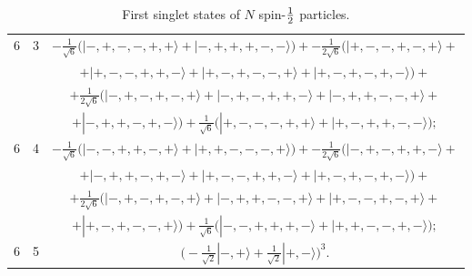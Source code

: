\documentclass[pra,amsfonts,showpacs,preprint,showkeys]{revtex4}
\begin{document}
\begin{table}
\begin{tabular}{ccc}
6&3&$ -\frac{1}{{\sqrt{6}}}\big(|-,+,-,-,+,+\rangle
+|-,+,+,+,-,-\rangle\big)+-\frac{1}{2
{\sqrt{6}}}\big(|+,-,-,+,-,+\rangle +$\\&&$+ |+,-,-,+,+,-\rangle+
 |+,-,+,-,-,+\rangle +|+,-,+,-,+,-\rangle\big)+$\\&&$ +\frac{1}{2 {\sqrt{6}}}\big(|-,+,-,+,-,+\rangle +
 |-,+,-,+,+,-\rangle +|-,+,+,-,-,+\rangle
 +$\\&&$+|-,+,+,-,+,-\rangle\big)+
 \frac{1}{{\sqrt{6}}}\big(|+,-,-,-,+,+\rangle +|+,-,+,+,-,-\rangle\big)
 ;$\\

6&4&$ -\frac{1}{{\sqrt{6}}}\big(|-,-,+,+,-,+\rangle +
|+,+,-,-,-,+\rangle\big) +-\frac{1}{2
{\sqrt{6}}}\big(|-,+,-,+,+,-\rangle+$\\&&$ +|-,+,+,-,+,-\rangle +
|+,-,-,+,+,-\rangle +|+,-,+,-,+,-\rangle\big)+$\\&&$ +\frac{1}{2
{\sqrt{6}}}\big(|-,+,-,+,-,+\rangle +
 |-,+,+,-,-,+\rangle +|+,-,-,+,-,+\rangle+$\\&&$ +|+,-,+,-,-,+\rangle\big) +
 \frac{1}{{\sqrt{6}}}\big(|-,-,+,+,+,-\rangle
 +|+,+,-,-,+,-\rangle\big);$\\

6&5&$\big(-\frac{1}{{\sqrt{2}}}|-,+\rangle
+\frac{1}{{\sqrt{2}}}|+,-\rangle\big)^3.$\\\hline\hline

\end{tabular}
\caption{First singlet states of $N$ spin-${1\over 2}$ particles.
\label{2005-singlet-t12}}
\end{table}
\clearpage
\end{document}
